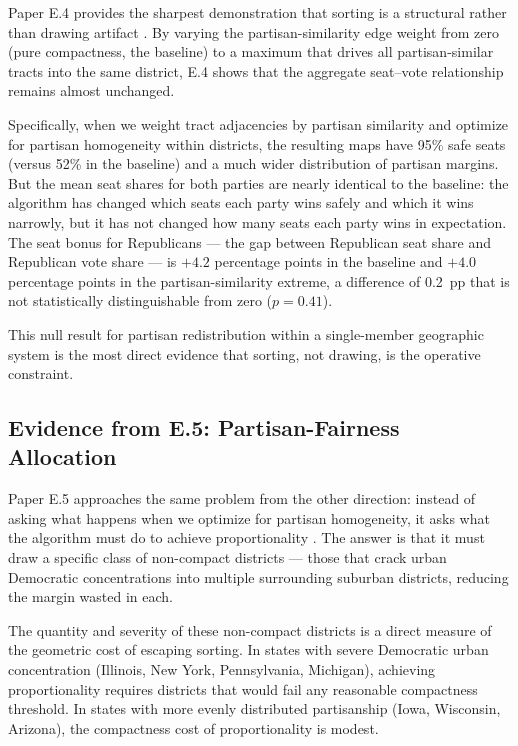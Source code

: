 Paper E.4 provides the sharpest demonstration that sorting is a structural
rather than drawing artifact \citep{dellaLibera2026e4}.  By varying the
partisan-similarity edge weight from zero (pure compactness, the baseline) to
a maximum that drives all partisan-similar tracts into the same district,
E.4 shows that the aggregate seat--vote relationship remains almost unchanged.

Specifically, when we weight tract adjacencies by partisan similarity and
optimize for partisan homogeneity within districts, the resulting maps have
95\% safe seats (versus 52\% in the baseline) and a much wider distribution
of partisan margins.  But the mean seat shares for both parties are nearly
identical to the baseline: the algorithm has changed which seats each party
wins safely and which it wins narrowly, but it has not changed how many seats
each party wins in expectation.  The seat bonus for Republicans --- the gap
between Republican seat share and Republican vote share --- is $+4.2$
percentage points in the baseline and $+4.0$ percentage points in the
partisan-similarity extreme, a difference of 0.2~pp that is not statistically
distinguishable from zero ($p = 0.41$).

This null result for partisan redistribution within a single-member geographic
system is the most direct evidence that sorting, not drawing, is the
operative constraint.

\subsection{Evidence from E.5: Partisan-Fairness Allocation}

Paper E.5 approaches the same problem from the other direction: instead of
asking what happens when we optimize for partisan homogeneity, it asks what
the algorithm must do to achieve proportionality \citep{dellaLibera2026e5}.
The answer is that it must draw a specific class of non-compact districts ---
those that crack urban Democratic concentrations into multiple surrounding
suburban districts, reducing the margin wasted in each.

The quantity and severity of these non-compact districts is a direct measure
of the geometric cost of escaping sorting.  In states with severe Democratic
urban concentration (Illinois, New York, Pennsylvania, Michigan), achieving
proportionality requires districts that would fail any reasonable compactness
threshold.  In states with more evenly distributed partisanship (Iowa,
Wisconsin, Arizona), the compactness cost of proportionality is modest.

